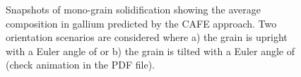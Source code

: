 {\begin{figure}[htbp]
\begin{subfigure}[t]{0.35\textwidth}
			\caption{}
  			\end{subfigure}
      		\caption{Snapshots of mono-grain solidification showing the average composition in gallium predicted by the CAFE approach. 
 			Two orientation scenarios are considered where a) the grain is upright with a Euler angle of  
 			or b) the grain is tilted with a Euler angle of  (check animation in the PDF file).}
			\label{fig:animate_monograin}
			\end{figure}
	}

